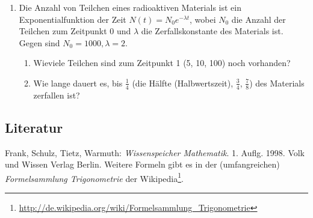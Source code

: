 \begin{enumerate}
  \item Die Anzahl von Teilchen eines radioaktiven Materials ist ein
Exponentialfunktion der Zeit $N(t) = N_0e^{-\lambda t}$, wobei $N_0$ die
Anzahl der Teilchen zum Zeitpunkt 0 und $\lambda$ die Zerfallskonstante des
Materials ist. Gegen sind $N_0= 1000, \lambda = 2$.
\begin{enumerate}
  \item Wieviele Teilchen sind zum Zeitpunkt 1 (5, 10, 100) noch vorhanden?
  \item Wie lange dauert es, bis $\frac{1}{4}$ (die Hälfte (Halbwertszeit),
$\frac{3}{4}$, $\frac{7}{8}$) des Materials zerfallen ist?
\end{enumerate}

\end{enumerate}



\subsection{Literatur}
Frank, Schulz, Tietz, Warmuth: \textit{Wissenspeicher Mathematik}. 1. Auflg.
1998. Volk und Wissen Verlag Berlin. 
Weitere Formeln gibt es in der (umfangreichen) \emph{Formelsammlung
Trigonometrie} der Wikipedia\footnote{\url{http://de.wikipedia.org/wiki/Formelsammlung_Trigonometrie}}.


